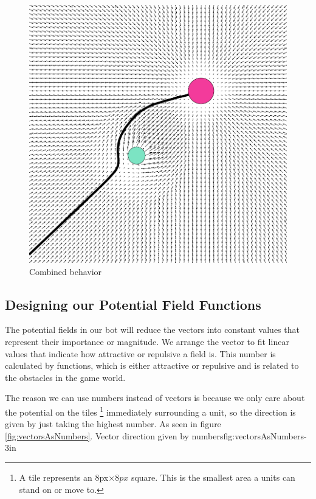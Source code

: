 	\begin{figure}[H]
		\begin{center}
			\includegraphics[scale=0.3]{Figures/Potentialfields/combined.png}
			\caption{Combined behavior\cite{pft}}\label{fig:combinedbehavior}
			\end{center}
	\end{figure}
		
	
	\subsection{Designing our Potential Field Functions}		
		The potential fields in our bot will reduce the vectors into constant values that represent their importance or magnitude. We arrange the vector to fit linear values that indicate how attractive or repulsive a field is. 
		This number is calculated by functions, which is either attractive or repulsive and is related to the obstacles in the game world. 
		
		The reason we can use numbers instead of vectors is because we only care about the potential on the tiles 
		\footnote{A tile represents an 8px$\times8px$ square. 
		This is the smallest area a units can stand on or move to.} 
		immediately surrounding a unit, so the direction is given by just taking the highest number. As seen in figure \ref{fig:vectorsAsNumbers}.
		{Vector direction given by numbers}{fig:vectorsAsNumbers}{-3in}
		\\
		
